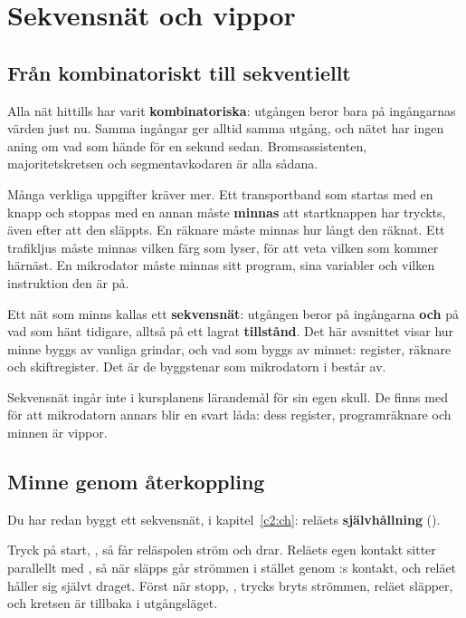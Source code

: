 
\section{Sekvensnät och vippor}
\label{c6:app:a}

\subsection{Från kombinatoriskt till sekventiellt}
\label{c6:a1}
Alla nät hittills har varit \textbf{kombinatoriska}: utgången beror bara på ingångarnas värden just
nu. Samma ingångar ger alltid samma utgång, och nätet har ingen aning om vad som hände för en
sekund sedan. Bromsassistenten, majoritetskretsen och segmentavkodaren är alla sådana.

Många verkliga uppgifter kräver mer. Ett transportband som startas med en knapp och stoppas med en
annan måste \textbf{minnas} att startknappen har tryckts, även efter att den släppts. En räknare
måste minnas hur långt den räknat. Ett trafikljus måste minnas vilken färg som lyser, för att veta
vilken som kommer härnäst. En mikrodator måste minnas sitt program, sina variabler och vilken
instruktion den är på.

Ett nät som minns kallas ett \textbf{sekvensnät}: utgången beror på ingångarna \textbf{och} på vad
som hänt tidigare, alltså på ett lagrat \textbf{tillstånd}. Det här avsnittet visar hur minne byggs
av vanliga grindar, och vad som byggs av minnet: register, räknare och skiftregister. Det är de
byggstenar som mikrodatorn i  består av.

Sekvensnät ingår inte i kursplanens lärandemål för sin egen skull. De finns med för att
mikrodatorn annars blir en svart låda: dess register, programräknare och minnen är vippor.

\subsection{Minne genom återkoppling}
\label{c6:a2}
Du har redan byggt ett sekvensnät, i kapitel~\ref{c2:ch}: reläets \textbf{självhållning}
().


Tryck på start, , så får reläspolen  ström och drar. Reläets egen kontakt
 sitter parallellt med , så när  släpps går strömmen i stället genom
:s kontakt, och reläet håller sig självt draget. Först när stopp, , trycks bryts
strömmen, reläet släpper, och kretsen är tillbaka i utgångsläget.

